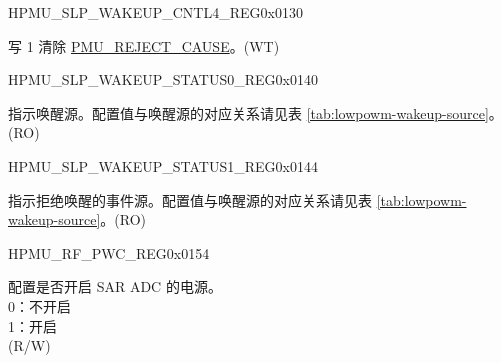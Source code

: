 \begin{register}{H}{PMU\_SLP\_WAKEUP\_CNTL4\_REG}{0x0130}\label{regdesc:PMUSLPWAKEUPCNTL4REG}
%
%
\regnewline%
\begin{regdesc}\begin{reglist}
\label{fielddesc:PMUSLPREJECTCAUSECLR}\item [PMU\_SLP\_REJECT\_CAUSE\_CLR] 写 1 清除 \hyperref[fielddesc:PMUREJECTCAUSE]{PMU\_REJECT\_CAUSE}。(WT)
\end{reglist}\end{regdesc}
\end{register}


\begin{register}{H}{PMU\_SLP\_WAKEUP\_STATUS0\_REG}{0x0140}\label{regdesc:PMUSLPWAKEUPSTATUS0REG}
%
\regnewline%
\begin{regdesc}\begin{reglist}
\label{fielddesc:PMUWAKEUPCAUSE}\item [PMU\_WAKEUP\_CAUSE] 指示唤醒源。配置值与唤醒源的对应关系请见表 \ref{tab:lowpowm-wakeup-source}。(RO)
\end{reglist}\end{regdesc}
\end{register}

\begin{register}{H}{PMU\_SLP\_WAKEUP\_STATUS1\_REG}{0x0144}\label{regdesc:PMUSLPWAKEUPSTATUS1REG}
%
\regnewline%
\begin{regdesc}\begin{reglist}
\label{fielddesc:PMUREJECTCAUSE}\item [PMU\_REJECT\_CAUSE] 指示拒绝唤醒的事件源。配置值与唤醒源的对应关系请见表 \ref{tab:lowpowm-wakeup-source}。(RO)
\end{reglist}\end{regdesc}
\end{register}

\begin{register}{H}{PMU\_RF\_PWC\_REG}{0x0154}\label{regdesc:PMURFPWCREG}
%
%
%
\regnewline%
\begin{regdesc}\begin{reglist}
\label{fielddesc:PMUXPDPERIFI2C}\item [PMU\_XPD\_PERIF\_I2C] 配置是否开启 SAR ADC 的电源。\\
0：不开启\\
1：开启\\
(R/W)
\end{reglist}\end{regdesc}
\end{register}


